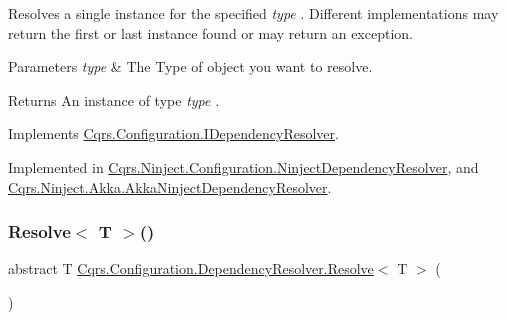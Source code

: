 Resolves a single instance for the specified {\itshape type} . Different implementations may return the first or last instance found or may return an exception. 


\begin{DoxyParams}{Parameters}
{\em type} & The Type of object you want to resolve.\\
\hline
\end{DoxyParams}
\begin{DoxyReturn}{Returns}
An instance of type {\itshape type} .
\end{DoxyReturn}


Implements \hyperlink{interfaceCqrs_1_1Configuration_1_1IDependencyResolver_aa455096b7b94fc1d64904bc67830ec06_aa455096b7b94fc1d64904bc67830ec06}{Cqrs.\+Configuration.\+I\+Dependency\+Resolver}.



Implemented in \hyperlink{classCqrs_1_1Ninject_1_1Configuration_1_1NinjectDependencyResolver_ab9da7f1556cc1ef205d03d3ff62017c0_ab9da7f1556cc1ef205d03d3ff62017c0}{Cqrs.\+Ninject.\+Configuration.\+Ninject\+Dependency\+Resolver}, and \hyperlink{classCqrs_1_1Ninject_1_1Akka_1_1AkkaNinjectDependencyResolver_adace29de71f10e34e952bd41e48106a6_adace29de71f10e34e952bd41e48106a6}{Cqrs.\+Ninject.\+Akka.\+Akka\+Ninject\+Dependency\+Resolver}.

\mbox{\label{classCqrs_1_1Configuration_1_1DependencyResolver_a1eb177fc6c914b45d138642fb6d9454d_a1eb177fc6c914b45d138642fb6d9454d}} 
\subsubsection{\texorpdfstring{Resolve$<$ T $>$()}{Resolve< T >()}}
{\footnotesize\ttfamily abstract T \hyperlink{classCqrs_1_1Configuration_1_1DependencyResolver_aaeeb3ad2e0ef44bd98469d843210205c_aaeeb3ad2e0ef44bd98469d843210205c}{Cqrs.\+Configuration.\+Dependency\+Resolver.\+Resolve}$<$ T $>$ (\begin{DoxyParamCaption}{ }\end{DoxyParamCaption})\hspace{0.3cm}{\ttfamily [pure virtual]}}



